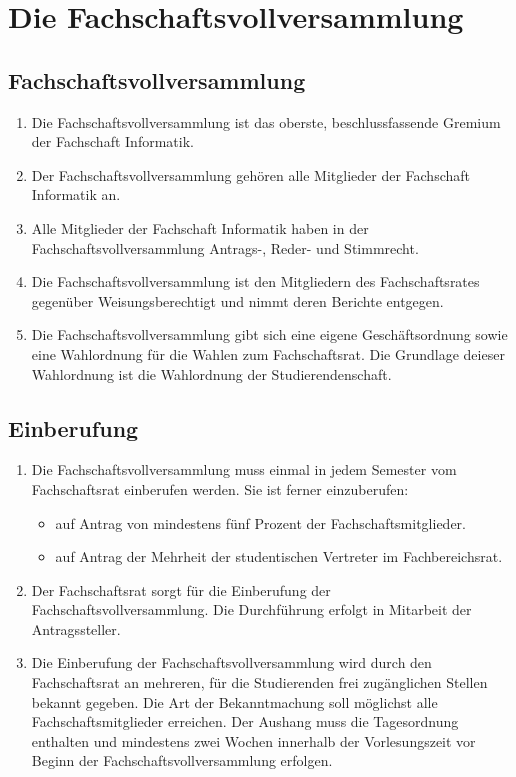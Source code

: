 \section {Die Fachschaftsvollversammlung}

\subsection{Fachschaftsvollversammlung}
\begin{enumerate}
\item Die Fachschaftsvollversammlung ist das oberste, beschlussfassende Gremium der Fachschaft Informatik.
\item Der Fachschaftsvollversammlung gehören alle Mitglieder der Fachschaft Informatik an.
\item Alle Mitglieder der Fachschaft Informatik haben in der Fachschaftsvollversammlung Antrags-, Reder- und Stimmrecht.
\item Die Fachschaftsvollversammlung ist den Mitgliedern des Fachschaftsrates gegenüber Weisungsberechtigt und nimmt deren Berichte entgegen.
\item Die Fachschaftsvollversammlung gibt sich eine eigene Geschäftsordnung sowie eine Wahlordnung für die Wahlen zum Fachschaftsrat. Die Grundlage deieser Wahlordnung ist die Wahlordnung der Studierendenschaft.
\end{enumerate}

\subsection{Einberufung}
\begin{enumerate}
\item Die Fachschaftsvollversammlung muss einmal in jedem Semester vom Fachschaftsrat einberufen werden. Sie ist ferner einzuberufen:
\begin{itemize}
\item auf Antrag von mindestens fünf Prozent der Fachschaftsmitglieder.
\item auf Antrag der Mehrheit der studentischen Vertreter im Fachbereichsrat.
\end{itemize}
\item Der Fachschaftsrat sorgt für die Einberufung der Fachschaftsvollversammlung. Die Durchführung erfolgt in Mitarbeit der Antragssteller.
\item Die Einberufung der Fachschaftsvollversammlung wird durch den Fachschaftsrat an mehreren, für die Studierenden frei zugänglichen Stellen bekannt gegeben. Die Art der Bekanntmachung soll möglichst alle Fachschaftsmitglieder erreichen. Der Aushang muss die Tagesordnung enthalten und mindestens zwei Wochen innerhalb der Vorlesungszeit vor Beginn der Fachschaftsvollversammlung erfolgen.
\end{enumerate}

